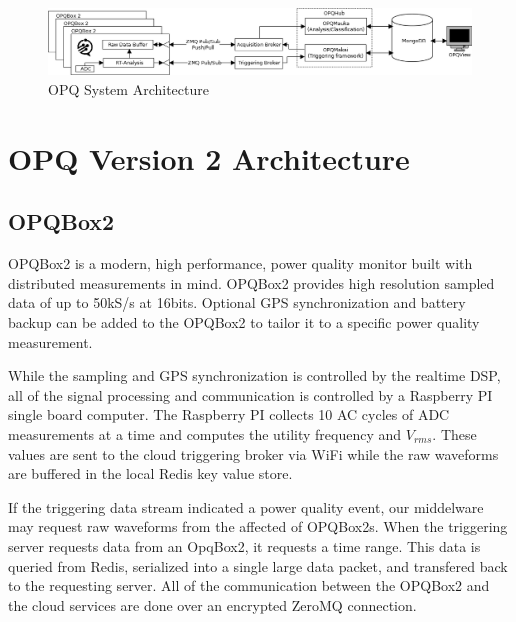 \documentclass[a4paper, conference]{IEEEtran}
\begin{document}
\begin{figure}[htb!]\label{fig:system-architecture}
    \centering
    \includegraphics[width=0.9\linewidth]{img/system-diagram}
    \caption{OPQ System Architecture}
\end{figure}


\section{OPQ Version 2 Architecture}
\subsection{OPQBox2}
OPQBox2 is a modern, high performance, power quality monitor built with distributed measurements in mind. OPQBox2 provides high resolution sampled data of up to 50kS/s at 16bits. Optional GPS synchronization and battery backup can be added to the OPQBox2 to tailor it to a specific power quality measurement. 

While the sampling and GPS synchronization is controlled by the realtime DSP, all of the signal processing and communication is controlled by a Raspberry PI single board computer. The Raspberry PI collects 10 AC cycles of ADC measurements at a time and computes the utility frequency and $V_{rms}$. These values are sent to the cloud triggering broker via WiFi while the raw waveforms are buffered in the local Redis key value store.

If the triggering data stream indicated a power quality event, our middelware may request raw waveforms from the affected of OPQBox2s. When the triggering server requests data from an OpqBox2, it requests a time range. This data is queried from Redis, serialized into a single large data packet, and transfered back to the requesting server. All of the communication between the OPQBox2 and the cloud services are done over an encrypted ZeroMQ connection.\cite{fengping2012distributed}
\end{document}
